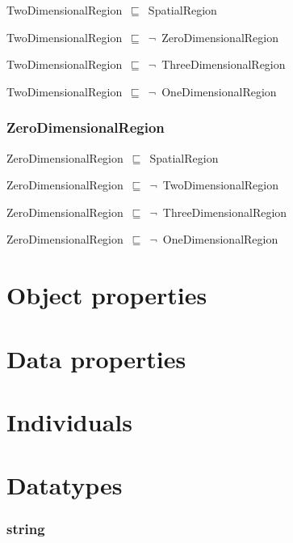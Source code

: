 \documentclass{article}
\begin{document}
TwoDimensionalRegion~\ensuremath{\sqsubseteq}~SpatialRegion~

TwoDimensionalRegion~\ensuremath{\sqsubseteq}~\ensuremath{\lnot}~ZeroDimensionalRegion

TwoDimensionalRegion~\ensuremath{\sqsubseteq}~\ensuremath{\lnot}~ThreeDimensionalRegion

TwoDimensionalRegion~\ensuremath{\sqsubseteq}~\ensuremath{\lnot}~OneDimensionalRegion

\subsubsection*{ZeroDimensionalRegion}

ZeroDimensionalRegion~\ensuremath{\sqsubseteq}~SpatialRegion~

ZeroDimensionalRegion~\ensuremath{\sqsubseteq}~\ensuremath{\lnot}~TwoDimensionalRegion

ZeroDimensionalRegion~\ensuremath{\sqsubseteq}~\ensuremath{\lnot}~ThreeDimensionalRegion

ZeroDimensionalRegion~\ensuremath{\sqsubseteq}~\ensuremath{\lnot}~OneDimensionalRegion

\section*{Object properties}\section*{Data properties}\section*{Individuals}\section*{Datatypes}\subsubsection*{string}
\end{document}
